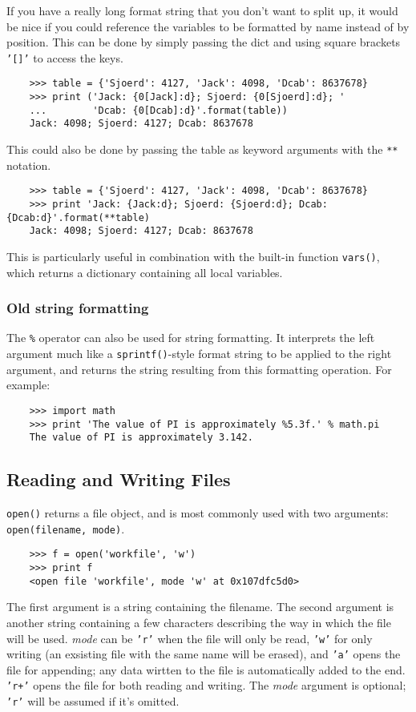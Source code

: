 \documentclass[UTF8]{article}
\begin{document}
If you have a really long format string that you don't want to split up, it would be nice if you
could reference the variables to be formatted by name instead of by position. This can be done by
simply passing the dict and using square brackets \texttt{'[]'} to access the keys.
\begin{verbatim}
    >>> table = {'Sjoerd': 4127, 'Jack': 4098, 'Dcab': 8637678}
    >>> print ('Jack: {0[Jack]:d}; Sjoerd: {0[Sjoerd]:d}; '
    ...        'Dcab: {0[Dcab]:d}'.format(table))
    Jack: 4098; Sjoerd: 4127; Dcab: 8637678
\end{verbatim}

This could also be done by passing the table as keyword arguments with the \texttt{**} notation.
\begin{verbatim}
    >>> table = {'Sjoerd': 4127, 'Jack': 4098, 'Dcab': 8637678}
    >>> print 'Jack: {Jack:d}; Sjoerd: {Sjoerd:d}; Dcab: {Dcab:d}'.format(**table)
    Jack: 4098; Sjoerd: 4127; Dcab: 8637678
\end{verbatim}

This is particularly useful in combination with the built-in function \texttt{vars()}, which
returns a dictionary containing all local variables.

\subsubsection{Old string formatting}
The \texttt{\%} operator can also be used for string formatting. It interprets the left argument
much like a \texttt{sprintf()}-style format string to be applied to the right argument, and returns
the string resulting from this formatting operation. For example:
\begin{verbatim}
    >>> import math
    >>> print 'The value of PI is approximately %5.3f.' % math.pi
    The value of PI is approximately 3.142.
\end{verbatim}

\subsection{Reading and Writing Files}
\texttt{open()} returns a file object, and is most commonly used with two arguments:
\texttt{open(filename, mode)}.
\begin{verbatim}
    >>> f = open('workfile', 'w')
    >>> print f
    <open file 'workfile', mode 'w' at 0x107dfc5d0>
\end{verbatim}
The first argument is a string containing the filename. The second argument is another string
containing a few characters  describing the way in which the file will be used. \emph{mode} can be
\texttt{'r'} when the file will only be read, \texttt{'w'} for only writing (an exsisting file with
the same name will be erased), and \texttt{'a'} opens the file for appending; any data wirtten to
the file is automatically added to the end. \texttt{'r+'} opens the file for both reading and
writing. The \emph{mode} argument is optional; \texttt{'r'} will be assumed if it's omitted.
\end{document}

